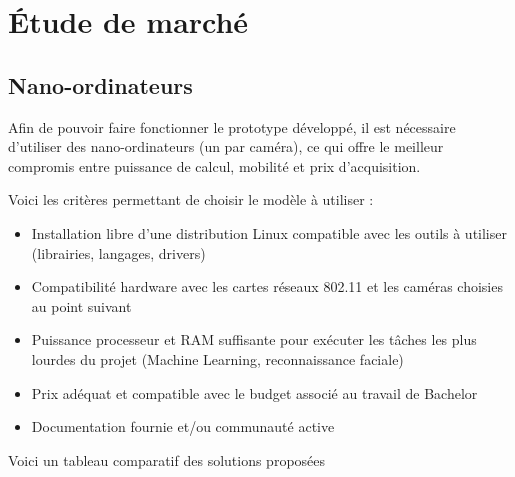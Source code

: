 \chapter{Étude de marché}
\label{ch:etude-de-marche}

\section{Nano-ordinateurs}

Afin de pouvoir faire fonctionner le prototype développé, il est nécessaire d’utiliser des nano-ordinateurs (un par
caméra), ce qui offre le meilleur compromis entre puissance de calcul, mobilité et prix d’acquisition.

Voici les critères permettant de choisir le modèle à utiliser :
\begin{itemize}
\item Installation libre d’une distribution Linux compatible avec les outils à utiliser (librairies, langages, drivers)
\item Compatibilité hardware avec les cartes réseaux 802.11 et les caméras choisies au point suivant
\item Puissance processeur et RAM suffisante pour exécuter les tâches les plus lourdes du projet (Machine
Learning, reconnaissance faciale)
\item Prix adéquat et compatible avec le budget associé au travail de Bachelor
\item Documentation fournie et/ou communauté active
\end{itemize}

Voici un tableau comparatif des solutions proposées

